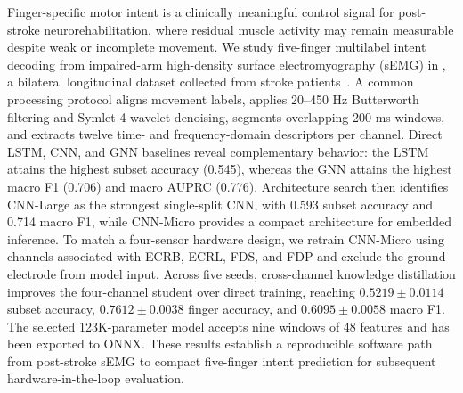 Finger-specific motor intent is a clinically meaningful control signal for post-stroke neurorehabilitation, where residual muscle activity may remain measurable despite weak or incomplete movement. We study five-finger multilabel intent decoding from impaired-arm high-density surface electromyography (sEMG) in \physiomio, a bilateral longitudinal dataset collected from stroke patients~\citep{physiomioData2026}. A common processing protocol aligns movement labels, applies 20--450 Hz Butterworth filtering and Symlet-4 wavelet denoising, segments overlapping 200 ms windows, and extracts twelve time- and frequency-domain descriptors per channel. Direct LSTM, CNN, and GNN baselines reveal complementary behavior: the LSTM attains the highest subset accuracy (0.545), whereas the GNN attains the highest macro F1 (0.706) and macro AUPRC (0.776). Architecture search then identifies CNN-Large as the strongest single-split CNN, with 0.593 subset accuracy and 0.714 macro F1, while CNN-Micro provides a compact architecture for embedded inference. To match a four-sensor hardware design, we retrain CNN-Micro using channels associated with ECRB, ECRL, FDS, and FDP and exclude the ground electrode from model input. Across five seeds, cross-channel knowledge distillation improves the four-channel student over direct training, reaching $0.5219\pm0.0114$ subset accuracy, $0.7612\pm0.0038$ finger accuracy, and $0.6095\pm0.0058$ macro F1. The selected 123K-parameter model accepts nine windows of 48 features and has been exported to ONNX. These results establish a reproducible software path from post-stroke sEMG to compact five-finger intent prediction for subsequent hardware-in-the-loop evaluation.
